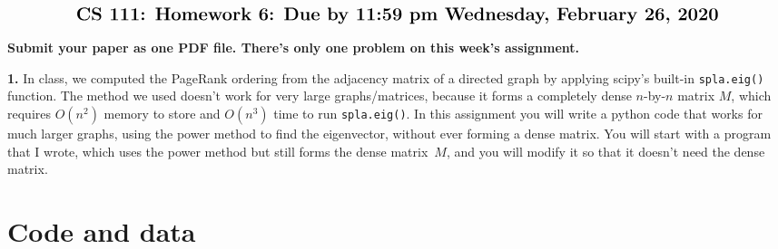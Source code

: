 \documentclass[11pt]{article}
\begin{document}
$$\mbox{\Large \bf CS 111: Homework 6: Due by 11:59 pm Wednesday, February 26, 2020}$$
\par\smallskip\noindent
{\bf Submit your paper as one PDF file.
There's only one problem on this week's assignment.}

\par\bigskip
{\bf 1.}
In class, we computed the PageRank ordering from the adjacency matrix
of a directed graph by applying scipy's built-in {\tt spla.eig()} function.  
The method we used doesn't work for very large graphs/matrices, because
it forms a completely dense $n$-by-$n$ matrix $M$, which requires $O(n^2)$ 
memory to store and $O(n^3)$ time to run {\tt spla.eig()}.
In this assignment you will write a python code that works for much
larger graphs, using the power method to find the eigenvector, without
ever forming a dense matrix.
You will start with a program that I wrote, which uses the
power method but still forms the dense matrix~$M$, and you will
modify it so that it doesn't need the dense matrix.

\section{Code and data}
\end{document}
